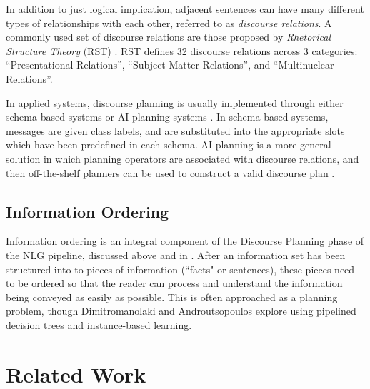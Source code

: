 \documentclass[12pt]{article}
\begin{document}
In addition to just logical implication, adjacent sentences can have many different types of relationships with each other, referred to as {\em discourse relations}. A commonly used set of discourse relations are those proposed by {\em Rhetorical Structure Theory} (RST) \cite{rst}. RST defines 32 discourse relations across 3 categories: ``Presentational Relations'', ``Subject Matter Relations'', and ``Multinuclear Relations''.

In applied systems, discourse planning is usually implemented through either schema-based systems or AI planning systems \cite{applied_nlg}. In schema-based systems, messages are given class labels, and are substituted into the appropriate slots which have been predefined in each schema. AI planning is a more general solution in which planning operators are associated with discourse relations, and then off-the-shelf planners can be used to construct a valid discourse plan \cite{hovy1993automated}\cite{paris1990natural}.

\subsection{Information Ordering}

Information ordering is an integral component of the Discourse Planning phase
of the NLG pipeline, discussed above and in \cite{applied_nlg}. After an
information set has been structured into to pieces of information (``facts" or
sentences), these pieces need to be ordered so that the reader can process and
understand the information being conveyed as easily as possible. This is often
approached as a planning problem, though Dimitromanolaki and
Androutsopoulos\cite{learning_to_order_facts} explore using pipelined decision
trees and instance-based learning.

\section{Related Work}
\end{document}
